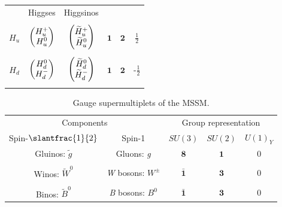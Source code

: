 \begin{table}
\begin{tabular}{cccccc}
                    & Higgses                                         & Higgsinos                                                                      &                    &              & \\ \cmidrule{2-3}\\
    $H_u$           & $\begin{pmatrix} H_u^+ \\ H_u^0\end{pmatrix}$                       & $\begin{pmatrix} \widetilde{H}_u^+ \\ \widetilde{H}_u^0\end{pmatrix}$                              & $\mathbf{1}$       & $\mathbf{2}$ & $\frac{1}{2}$\\\\
    $H_d$           & $\begin{pmatrix} H_d^0 \\ H_d^-\end{pmatrix}$                       & $\begin{pmatrix} \widetilde{H}_d^0 \\ \widetilde{H}_d^-\end{pmatrix}$                              & $\mathbf{1}$       & $\mathbf{2}$ & -$\frac{1}{2}$\\\\
    \bottomrule
  \end{tabular}
  \label{tab:chiral_supermultiplets}
\end{table}

\begin{table}
  \caption{Gauge supermultiplets of the MSSM.}
  \begin{tabular}{ccccc}
    \toprule
\multicolumn{2}{c}{Components} & \multicolumn{3}{c}{Group representation} \\ \cmidrule(r){1-2}\cmidrule(l){3-5}
Spin-$\slantfrac{1}{2}$        & Spin-1                                                                         & $SU(3)$          & $SU(2)$    & $U(1)_Y$\\\midrule
Gluinos: $\widetilde{g}$       & Gluons: \emph{g}                                                               & $\mathbf{8}$       & $\mathbf{1}$ & $0$ \\\\
Winos: $\widetilde{W}^0$       & \emph{W} bosons: $W^\pm$                                                              & $\bar{\mathbf{1}}$ & $\mathbf{3}$ & $0$\\\\
Binos: $\widetilde{B}^0$       & \emph{B} bosons: $B^0$                                                                & $\bar{\mathbf{1}}$ & $\mathbf{3}$ & $0$\\
    \bottomrule
  \end{tabular}
  \label{tab:gauge_supermultiplets}
\end{table}

